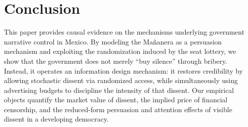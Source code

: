 \documentclass[12pt]{article}
\begin{document}
\section{Conclusion}
This paper provides causal evidence on the mechanisms underlying government narrative control in Mexico. By modeling the Mañanera as a persuasion mechanism and exploiting the randomization induced by the seat lottery, we show that the government does not merely ``buy silence'' through bribery. Instead, it operates an information design mechanism: it restores credibility by allowing stochastic dissent via randomized access, while simultaneously using advertising budgets to discipline the intensity of that dissent. Our empirical objects quantify the market value of dissent, the implied price of financial censorship, and the reduced-form persuasion and attention effects of visible dissent in a developing democracy.

\clearpage


\end{document}
